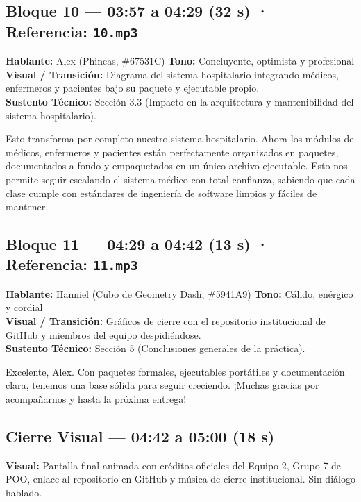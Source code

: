 \documentclass[letterpaper,11pt]{article}
\begin{document}
\subsection*{Bloque 10 — 03:57 a 04:29 (32 s) · Referencia: \texttt{10.mp3}}
\textbf{Hablante:} Alex \textcolor{colorAlex}{(Phineas, \#67531C)} \hfill \textbf{Tono:} Concluyente, optimista y profesional\\
\textbf{Visual / Transición:} Diagrama del sistema hospitalario integrando médicos, enfermeros y pacientes bajo su paquete y ejecutable propio.\\
\textbf{Sustento Técnico:} Sección 3.3 (Impacto en la arquitectura y mantenibilidad del sistema hospitalario).
\begin{tcolorbox}[colback=colorAlex!5,colframe=colorAlex,title=\textbf{Locución Definitiva — Alex}]
Esto transforma por completo nuestro sistema hospitalario. Ahora los módulos de médicos, enfermeros y pacientes están perfectamente organizados en paquetes, documentados a fondo y empaquetados en un único archivo ejecutable. Esto nos permite seguir escalando el sistema médico con total confianza, sabiendo que cada clase cumple con estándares de ingeniería de software limpios y fáciles de mantener.
\end{tcolorbox}

\subsection*{Bloque 11 — 04:29 a 04:42 (13 s) · Referencia: \texttt{11.mp3}}
\textbf{Hablante:} Hanniel \textcolor{colorHanniel}{(Cubo de Geometry Dash, \#5941A9)} \hfill \textbf{Tono:} Cálido, enérgico y cordial\\
\textbf{Visual / Transición:} Gráficos de cierre con el repositorio institucional de GitHub y miembros del equipo despidiéndose.\\
\textbf{Sustento Técnico:} Sección 5 (Conclusiones generales de la práctica).
\begin{tcolorbox}[colback=colorHanniel!5,colframe=colorHanniel,title=\textbf{Locución Definitiva — Hanniel}]
Excelente, Alex. Con paquetes formales, ejecutables portátiles y documentación clara, tenemos una base sólida para seguir creciendo. ¡Muchas gracias por acompañarnos y hasta la próxima entrega!
\end{tcolorbox}

\subsection*{Cierre Visual — 04:42 a 05:00 (18 s)}
\textbf{Visual:} Pantalla final animada con créditos oficiales del Equipo 2, Grupo 7 de POO, enlace al repositorio en GitHub y música de cierre institucional. Sin diálogo hablado.
\end{document}
